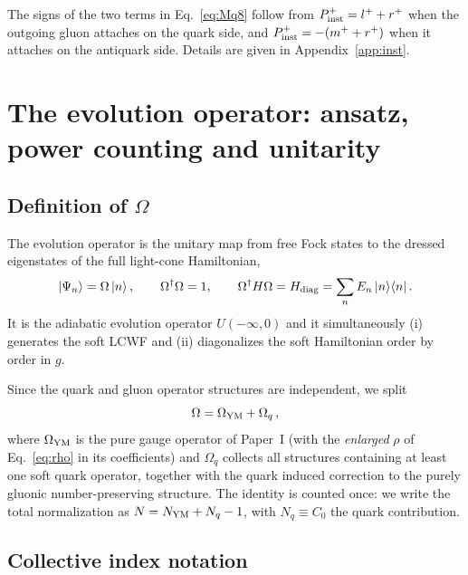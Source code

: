 \documentclass[11pt]{article}
\newcommand{\dg}{\dagger}
\newcommand{\ket}[1]{\left|#1\right\rangle}
\newcommand{\bra}[1]{\left\langle#1\right|}
\newcommand{\OM}{\Omega}
\newcommand{\OMq}{\OM_{q}}
\begin{document}
The signs of the two terms in Eq.~\eqref{eq:Mq8} follow from $P^+_{\rm inst}=l^++r^+$ when the
outgoing gluon attaches on the quark side, and $P^+_{\rm inst}=-(m^++r^+)$ when it attaches on the
antiquark side. Details are given in Appendix~\ref{app:inst}.

\section{The evolution operator: ansatz, power counting and unitarity}
\label{sec:ansatz}

\subsection{Definition of $\OM$}

The evolution operator is the unitary map from free Fock states to the dressed eigenstates of the
full light-cone Hamiltonian,
\begin{equation}
\ket{\Psi_n}=\OM\ket{n},\qquad \OM^\dg\OM=1,\qquad \OM^\dg H\OM=H_{\rm diag}=\sum_n E_n\ket{n}\!\bra{n}.
\label{eq:Omdef}
\end{equation}
It is the adiabatic evolution operator $U(-\infty,0)$ and it simultaneously (i) generates the soft
LCWF and (ii) diagonalizes the soft Hamiltonian order by order in $g$.

Since the quark and gluon operator structures are independent, we split
\begin{equation}
\OM=\OM_{\rm YM}+\OMq\,,
\end{equation}
where $\OM_{\rm YM}$ is the pure gauge operator of Paper~I (with the {\em enlarged} $\rho$ of
Eq.~\eqref{eq:rho} in its coefficients) and $\OMq$ collects all structures containing at least one
soft quark operator, together with the quark induced correction to the purely gluonic
number-preserving structure. The identity is counted once: we write the total normalization as
$N=N_{\rm YM}+N_q-1$, with $N_q\equiv C_0$ the quark contribution.

\subsection{Collective index notation}
\end{document}
